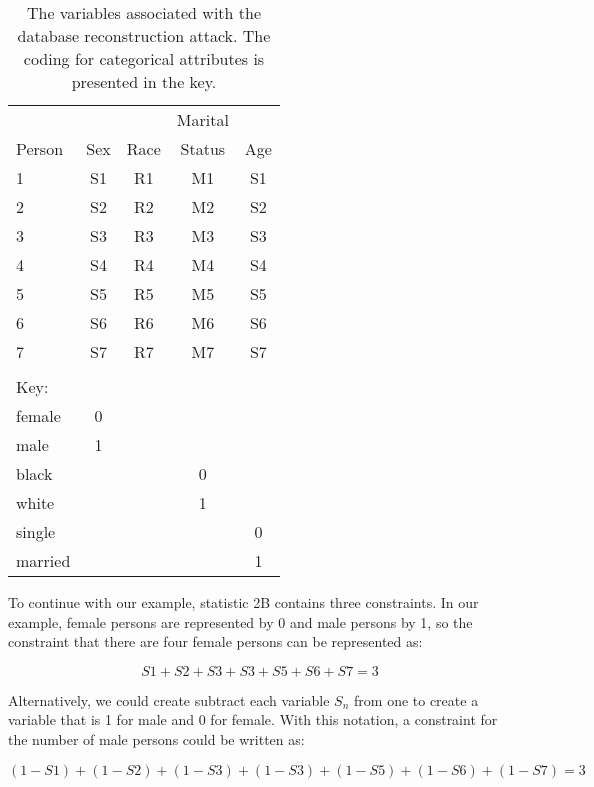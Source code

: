 \documentclass[runningheads]{llncs}
\begin{document}
\begin{center}
\begin{table}
\begin{tabular}{l|cccc}
       &     &      & Marital &     \\
Person & Sex & Race & Status  & Age \\
\hline                             
1      & S1  & R1   & M1      & S1  \\
2      & S2  & R2   & M2      & S2  \\
3      & S3  & R3   & M3      & S3  \\
4      & S4  & R4   & M4      & S4  \\
5      & S5  & R5   & M5      & S5  \\
6      & S6  & R6   & M6      & S6  \\
7      & S7  & R7   & M7      & S7  \\
\hline
\\
\multicolumn{1}{l}{Key:}\\
\hline
female &  0  &     & \\
male   &  1  &     & \\
\hline
black  &     &     &  0   & \\
white  &     &     &  1   & \\
\hline
single &     &     &      &   0\\
married&     &     &      &   1\\
\hline
\end{tabular}
\caption{The variables associated with the database reconstruction
  attack. The coding for categorical attributes is presented in the key.}\label{variables}
\end{table}
\end{center}

To continue with our example, statistic 2B contains three
constraints. In our example, female persons
are represented by 0
and male persons by 1, so the constraint that there are four female persons can be represented as:

\begin{equation}\label{eq1}
S1 + S2 + S3 + S3 + S5 + S6 + S7 = 3
\end{equation}

Alternatively, we could create subtract each variable $S_n$ from one
to create a variable that is 1 for male and 0 for female. With this
notation, a constraint for the number of male persons could be written as:

\begin{equation}
(1-S1) + (1-S2) + (1-S3) + (1-S3) + (1-S5) + (1-S6) + (1-S7) = 3
\end{equation}
\end{document}
